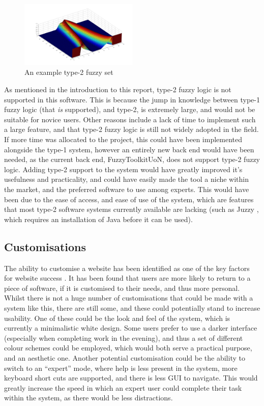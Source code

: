 \begin{figure}[ht!]
	\begin{center}
		\includegraphics[width=0.5\textwidth]{images/type2set}
	\end{center}
	\vspace{-4mm}
	\caption{An example type-2 fuzzy set}
	\label{fig:fw-type2}
	\vspace{-1mm}
\end{figure}
\noindent
As mentioned in the introduction to this report, type-2 fuzzy logic is not supported in this software. This is because the jump in knowledge between type-1 fuzzy logic (that \emph{is} supported), and type-2, is extremely large, and would not be suitable for novice users. Other reasons include a lack of time to implement such a large feature, and that type-2 fuzzy logic is still not widely adopted in the field. If more time was allocated to the project, this could have been implemented alongside the type-1 system, however an entirely new back end would have been needed, as the current back end, FuzzyToolkitUoN, does not support type-2 fuzzy logic. Adding type-2 support to the system would have greatly improved it's usefulness and practicality, and could have easily made the tool a niche within the market, and the preferred software to use among experts. This would have been due to the ease of access, and ease of use of the system, which are  features that most type-2 software systems currently available are lacking (such as Juzzy \cite{wagner2013juzzy}, which requires an installation of Java before it can be used).

\subsection{Customisations}
The ability to customise a website has been identified as one of the key factors for website success \cite{fan2010factors}. It has been found that users are more likely to return to a piece of software, if it is customised to their needs, and thus more personal. Whilst there is not a huge number of customisations that could be made with a system like this, there are still some, and these could potentially stand to increase usability. One of these could be the look and feel of the system, which is currently a minimalistic white design. Some users prefer to use a darker interface (especially when completing work in the evening), and thus a set of different colour schemes could be employed, which would both serve a practical purpose, and an aesthetic one. Another potential customisation could be the ability to switch to an ``expert'' mode, where help is less present in the system, more keyboard short cuts are supported, and there is less GUI to navigate. This would greatly increase the speed in which an expert user could complete their task within the system, as there would be less distractions.